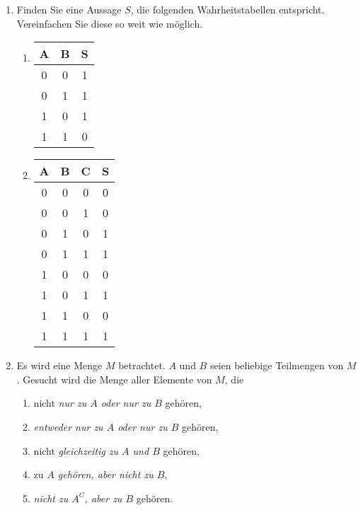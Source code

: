 \documentclass[12pt,a4paper]{scrreprt}
\begin{document}
\begin{enumerate}
 	\item Finden Sie eine Aussage $S$, die folgenden Wahrheitstabellen entspricht. Vereinfachen Sie diese so weit wie möglich.

\begin{center}

	\begin{enumerate}
		\item
			\begin{tabular}{c c | c}
				A & B & S \\
				\hline 
				0	&0	&1 \\
				0	&1	&1 \\
				1	&0	&1 \\
				1	&1	&0 
			\end{tabular}

		\item 
	
			\begin{tabular}{c c c| c}
				A & B & C &S \\
				\hline
				0	&0	&0	&0 \\
				0	&0	&1	&0 \\
				0	&1	&0	&1 \\
				0	&1	&1	&1 \\
				1	&0	&0	&0 \\
				1	& 0	&1	&1 \\
				1	&1	& 0	&0 \\
				1	&1	&1	&1 
			\end{tabular}
	
	\end{enumerate}
	\end{center}

    \item Es wird eine Menge $M$ betrachtet. $A$ und $B$ seien beliebige Teilmengen von $M$.  Gesucht wird die Menge aller Elemente von $M$, die

	\begin{enumerate}
		\item  nicht \textit{nur zu $A$ oder nur zu $B$} gehören,
		\item  \textit{entweder nur zu $A$ oder nur zu $B$} gehören,
		\item nicht \textit{gleichzeitig zu $A$ und $B$} gehören,
		\item zu \textit{$A$ gehören, aber nicht zu $B$},
		\item \textit{nicht zu $A^C$, aber zu $B$} gehören.
	\end{enumerate}
	

\end{enumerate}
\end{document}
